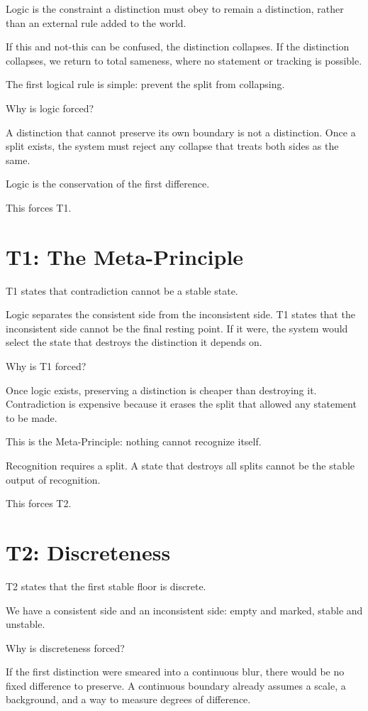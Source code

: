 \documentclass[11pt]{article}
\begin{document}
Logic is the constraint a distinction must obey to remain a distinction, rather than an external rule added to the world.

If this and not-this can be confused, the distinction collapses. If the distinction collapses, we return to total sameness, where no statement or tracking is possible.

The first logical rule is simple: prevent the split from collapsing.

Why is logic forced?

A distinction that cannot preserve its own boundary is not a distinction. Once a split exists, the system must reject any collapse that treats both sides as the same.

Logic is the conservation of the first difference.

This forces T1.

\section{T1: The Meta-Principle}

T1 states that contradiction cannot be a stable state.

Logic separates the consistent side from the inconsistent side. T1 states that the inconsistent side cannot be the final resting point. If it were, the system would select the state that destroys the distinction it depends on.

Why is T1 forced?

Once logic exists, preserving a distinction is cheaper than destroying it. Contradiction is expensive because it erases the split that allowed any statement to be made.

This is the Meta-Principle: nothing cannot recognize itself.

Recognition requires a split. A state that destroys all splits cannot be the stable output of recognition.

This forces T2.

\section{T2: Discreteness}

T2 states that the first stable floor is discrete.

We have a consistent side and an inconsistent side: empty and marked, stable and unstable.

Why is discreteness forced?

If the first distinction were smeared into a continuous blur, there would be no fixed difference to preserve. A continuous boundary already assumes a scale, a background, and a way to measure degrees of difference.
\end{document}

